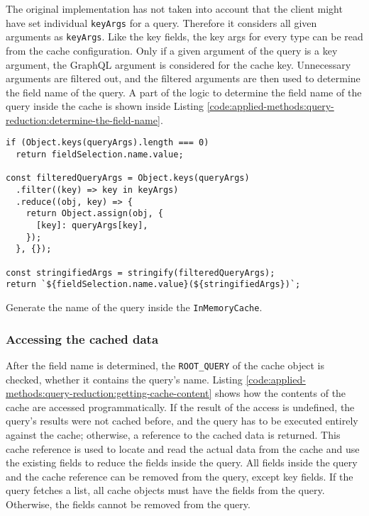 \bigskip

\noindent The original implementation has not taken into account that the client might have set individual \texttt{keyArgs} for a query. Therefore it considers all given arguments as \texttt{keyArgs}. Like the key fields, the key args for every type can be read from the cache configuration. Only if a given argument of the query is a key argument, the GraphQL argument is considered for the cache key. Unnecessary arguments are filtered out, and the filtered arguments are then used to determine the field name of the query. A part of the logic to determine the field name of the query inside the cache is shown inside Listing \ref{code:applied-methods:query-reduction:determine-the-field-name}.

\ifshowListings
\begin{listing}[H]
\begin{verbatim}
if (Object.keys(queryArgs).length === 0)
  return fieldSelection.name.value;

const filteredQueryArgs = Object.keys(queryArgs)
  .filter((key) => key in keyArgs)
  .reduce((obj, key) => {
    return Object.assign(obj, {
      [key]: queryArgs[key],
    });
  }, {});

const stringifiedArgs = stringify(filteredQueryArgs);
return `${fieldSelection.name.value}(${stringifiedArgs})`;
\end{verbatim}
\caption{Generate the name of the query inside the \texttt{InMemoryCache}.}\label{code:applied-methods:query-reduction:determine-the-field-name}
\end{listing}
\fi

\subsubsection{Accessing the cached data}

\noindent After the field name is determined, the \texttt{ROOT\_QUERY} of the cache object is checked, whether it contains the query's name. Listing \ref{code:applied-methods:query-reduction:getting-cache-content} shows how the contents of the cache are accessed programmatically. If the result of the access is undefined, the query's results were not cached before, and the query has to be executed entirely against the cache; otherwise, a reference to the cached data is returned. This cache reference is used to locate and read the actual data from the cache and use the existing fields to reduce the fields inside the query. All fields inside the query and the cache reference can be removed from the query, except key fields. If the query fetches a list, all cache objects must have the fields from the query. Otherwise, the fields cannot be removed from the query.

